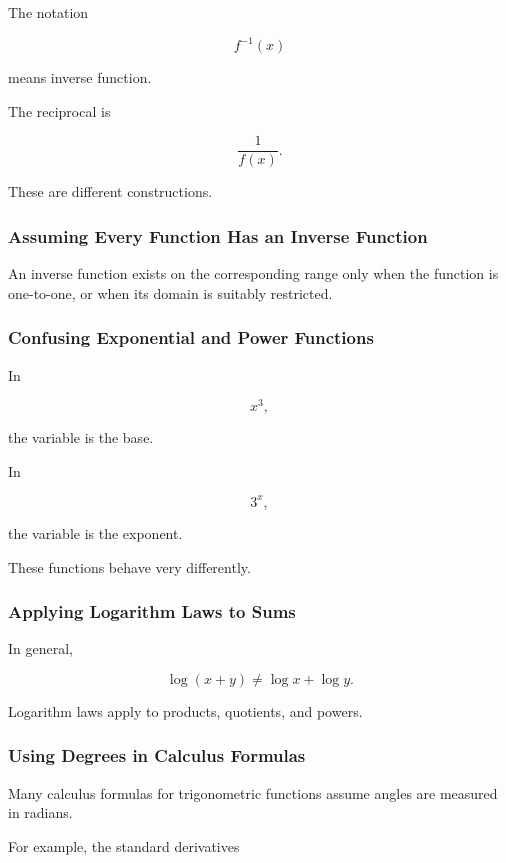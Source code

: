The notation

\[ f^{-1}(x) \]

means inverse function.

The reciprocal is

\[ \frac1{f(x)}. \]

These are different constructions.

\subsubsection{Assuming Every Function Has an Inverse Function}

An inverse function exists on the corresponding range only when the
function is one-to-one, or when its domain is suitably restricted.

\subsubsection{Confusing Exponential and Power Functions}

In

\[ x^3, \]

the variable is the base.

In

\[ 3^x, \]

the variable is the exponent.

These functions behave very differently.

\subsubsection{Applying Logarithm Laws to Sums}

In general,

\[ \log(x+y)\neq\log x+\log y. \]

Logarithm laws apply to products, quotients, and powers.

\subsubsection{Using Degrees in Calculus Formulas}

Many calculus formulas for trigonometric functions assume angles are measured
in radians.

For example, the standard derivatives


